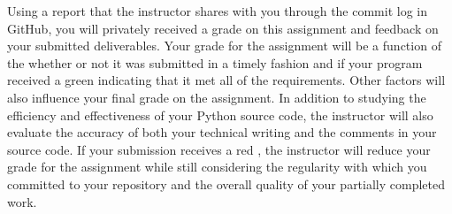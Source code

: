 \documentclass[11pt]{article}
\newcommand{\checkmark}{\ding{51}}
\newcommand{\naughtmark}{\ding{55}}
\begin{document}
Using a report that the instructor shares with you through the commit log in GitHub, you will privately received a grade
on this assignment and feedback on your submitted deliverables. Your grade for the assignment will be a function of the
whether or not it was submitted in a timely fashion and if your program received a green \checkmark{} indicating that it
met all of the requirements. Other factors will also influence your final grade on the assignment. In addition to
studying the efficiency and effectiveness of your Python source code, the instructor will also evaluate the accuracy of
both your technical writing and the comments in your source code. If your submission receives a red \naughtmark{}, the
instructor will reduce your grade for the assignment while still considering the regularity with which you committed to
your repository and the overall quality of your partially completed work.



\end{document}
